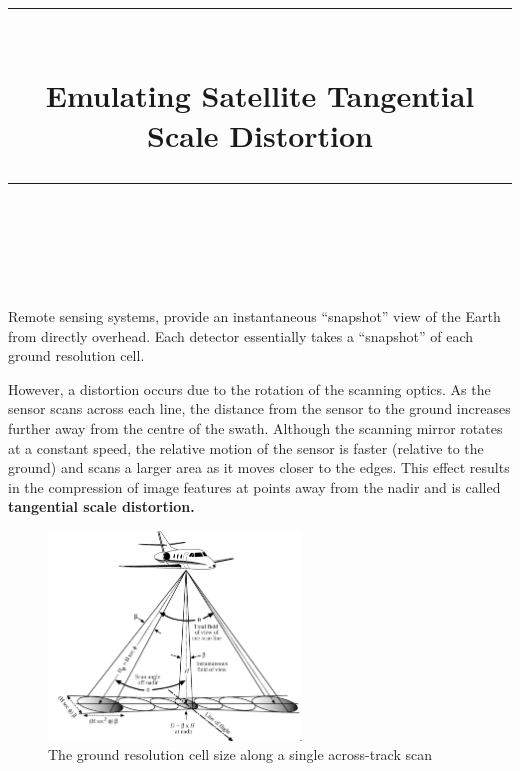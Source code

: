 \documentclass[11pt]{scrartcl}
\begin{document}

\newcommand{\horrule}[1]{\rule{\linewidth}{#1}} 	%

\title{
		\vspace{-0.5in}
		\horrule{0.5pt} \\[0.4cm]
		\Large Emulating Satellite Tangential Scale Distortion \\
		\horrule{2pt} \\
}
\date{}


\maketitle




Remote sensing systems, provide an instantaneous \enquote{snapshot} view of the Earth from directly overhead. Each detector essentially takes a \enquote{snapshot} of each ground resolution cell.

However, a distortion occurs due to the rotation of the scanning optics. As the sensor scans across each line, the distance from the sensor to the ground increases further away from the centre of the swath. Although the scanning mirror rotates at a constant speed, the relative motion of the sensor is faster (relative to the ground) and scans a larger area as it moves closer to the edges. This effect results in the compression of image features at points away from the nadir and is called \textbf{tangential scale distortion.}


\begin{figure}[h]\label{img:plane}
\centering
\includegraphics[width=0.6\textwidth]{img/plane_view.png}
\caption{The ground resolution cell size along a single across-track scan}
\end{figure}
\end{document}
